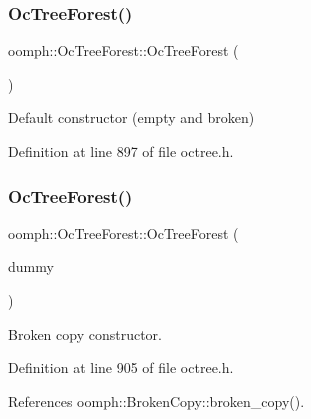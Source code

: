 \subsubsection{\texorpdfstring{Oc\+Tree\+Forest()}{OcTreeForest()}\hspace{0.1cm}{\footnotesize\ttfamily [2/3]}}
{\footnotesize\ttfamily oomph\+::\+Oc\+Tree\+Forest\+::\+Oc\+Tree\+Forest (\begin{DoxyParamCaption}{ }\end{DoxyParamCaption})\hspace{0.3cm}{\ttfamily [inline]}}



Default constructor (empty and broken) 



Definition at line 897 of file octree.\+h.

\mbox{\label{classoomph_1_1OcTreeForest_ab28c40f3d62a80f3061bacfdd0485445}} 
\subsubsection{\texorpdfstring{Oc\+Tree\+Forest()}{OcTreeForest()}\hspace{0.1cm}{\footnotesize\ttfamily [3/3]}}
{\footnotesize\ttfamily oomph\+::\+Oc\+Tree\+Forest\+::\+Oc\+Tree\+Forest (\begin{DoxyParamCaption}\item[{const \hyperlink{classoomph_1_1OcTreeForest}{Oc\+Tree\+Forest} \&}]{dummy }\end{DoxyParamCaption})\hspace{0.3cm}{\ttfamily [inline]}}



Broken copy constructor. 



Definition at line 905 of file octree.\+h.



References oomph\+::\+Broken\+Copy\+::broken\+\_\+copy().

\mbox{\label{classoomph_1_1OcTreeForest_ab38c7c43f9eb8caa898b49086308bfd8}} 
